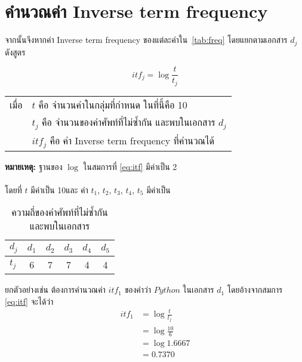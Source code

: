 \documentclass[11pt,a4paper]{article}
\newcommand{\numberOfCollection}{10}
\begin{document}
{    \clearpage
    \section{คำนวณค่า Inverse term frequency}
    จากนั้นจึงหากค่า Inverse term frequency ของแต่ละคำใน\tablename\ \ref{tab:freq} โดยแยกตามเอกสาร $d_j$ ดังสูตร

    \begin{equation} 
        \label{eq:itf}
        itf_j = \log{\frac{t}{t_j}}
    \end{equation}

    \begin{table}[ht!]
        \begin{tabular}{p{2cm}l}
            เมื่อ & $t$ คือ จำนวนคำในกลุ่มที่กำหนด ในที่นี้คือ \numberOfCollection\ \\
                & $t_j$ คือ จำนวนของคำศัพท์ที่ไม่ซ้ำกัน และพบในเอกสาร $d_j$ \\
                & $itf_j$ คือ ค่า Inverse term frequency ที่คำนวณได้ \\
        \end{tabular}
    \end{table}
    {\bf หมายเหตุ:} ฐานของ $\log$ ในสมการที่ \ref{eq:itf} มีค่าเป็น 2  \\\\

    โดยที่ $t$ มีค่าเป็น \numberOfCollection และ ค่า $t_1$, $t_2$, $t_3$, $t_4$, $t_5$ มีค่าเป็น 
    \begin{table}[ht!]
        \centering
        \caption{ความถี่ของคำศัพท์ที่ไม่ซ้ำกันและพบในเอกสาร}
        \label{tab:keywordfreq}
        \begin{tabular}{|l||ccccc|}
            \hline
            $d_j$ & $d_1$ & $d_2$ & $d_3$ & $d_4$ & $d_5$ \\
            \hline
            $t_j$ & 6     & 7     & 7     & 4     & 4 \\
            \hline
        \end{tabular}
    \end{table}

    ยกตัวอย่างเช่น ต้องการคำนวณค่า $itf_1$ ของคำว่า $Python$ ในเอกสาร $d_1$ โดยอ้างจากสมการ \ref{eq:itf} จะได้ว่า
    \begin{equation*}
        \begin{aligned}
            itf_1 &= \log{\frac{t}{t_j}} \\
                  &= \log{\frac{10}{6}} \\
                  &= \log{1.6667} \\
                  &= 0.7370
        \end{aligned}
    \end{equation*}

}
\end{document}
